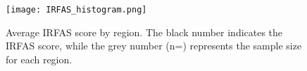 \begin{figure}[htbp]
    \centering
    \texttt{[image: IRFAS\_histogram.png]}
    \caption{Average IRFAS score by region. The black number indicates the IRFAS score, while the grey number (n=) represents the sample size for each region.}
    \label{fig:IRFAS_histogram}
\end{figure}
